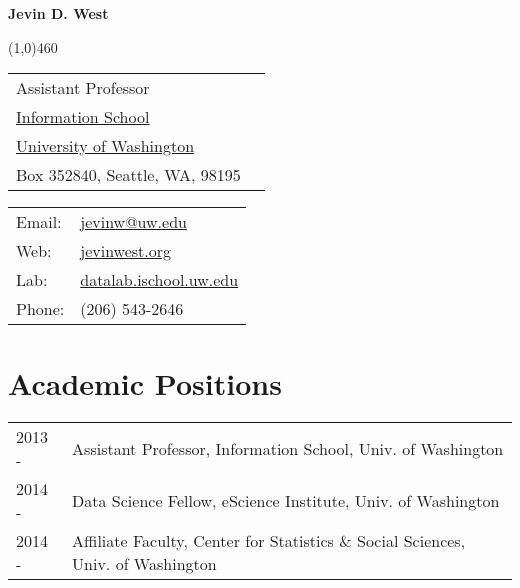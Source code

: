 \documentclass[11pt]{article}
\def\name{Jevin D. West}
\begin{document}


{\LARGE \bf \name}

\vspace{2mm}

\line(1,0){460}

\vspace{5mm}

\begin{minipage}{0.50\linewidth}
  \begin{tabular}{ll}
    Assistant Professor \\
    \href{https://ischool.uw.edu}{Information School} \\
    \href{http://www.washington.edu/}{University of Washington} \\
    Box 352840, Seattle, WA, 98195
  \end{tabular}
\end{minipage}
\begin{minipage}{0.40\linewidth}
  \begin{tabular}{ll}
  Email: & \href{mailto:jevinw@uw.edu}{jevinw@uw.edu} \\
  Web: & \href{http://jevinwest.org/}{jevinwest.org} \\
  Lab: & \href{https://datalab.ischool.uw.edu}{datalab.ischool.uw.edu} \\
  Phone: & (206) 543-2646
  \end{tabular}
\end{minipage}





\vspace{5mm}



\section*{\textbf{Academic Positions}}

\begin{tabular}{ll}
	2013 -  & Assistant Professor, Information School, Univ. of Washington \\
	2014 -  & Data Science Fellow, eScience Institute, Univ. of Washington \\
	2014 -  & Affiliate Faculty, Center for Statistics \& Social Sciences, Univ. of Washington \\
\end{tabular}
\end{document}
